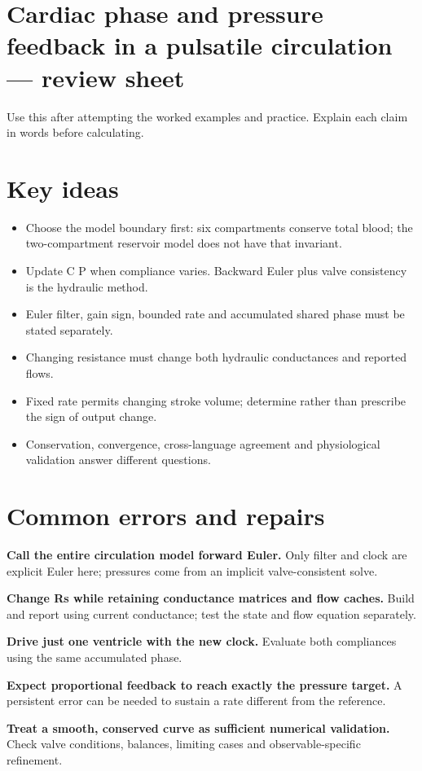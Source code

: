 \documentclass[11pt,letterpaper]{article}
\theoremstyle{definition}\newtheorem{definition}{Definition}\newtheorem{example}{Example}
\numberwithin{equation}{section}
\begin{document}
\section*{Cardiac phase and pressure feedback in a pulsatile circulation --- review sheet}
Use this after attempting the worked examples and practice. Explain each claim in words before calculating.

\section*{Key ideas}
\begin{itemize}
\item Choose the model boundary first: six compartments conserve total blood; the two-compartment reservoir model does not have that invariant.
\item Update C P when compliance varies. Backward Euler plus valve consistency is the hydraulic method.
\item Euler filter, gain sign, bounded rate and accumulated shared phase must be stated separately.
\item Changing resistance must change both hydraulic conductances and reported flows.
\item Fixed rate permits changing stroke volume; determine rather than prescribe the sign of output change.
\item Conservation, convergence, cross-language agreement and physiological validation answer different questions.
\end{itemize}
\section*{Common errors and repairs}
\textbf{Call the entire circulation model forward Euler.} Only filter and clock are explicit Euler here; pressures come from an implicit valve-consistent solve.

\textbf{Change Rs while retaining conductance matrices and flow caches.} Build and report using current conductance; test the state and flow equation separately.

\textbf{Drive just one ventricle with the new clock.} Evaluate both compliances using the same accumulated phase.

\textbf{Expect proportional feedback to reach exactly the pressure target.} A persistent error can be needed to sustain a rate different from the reference.

\textbf{Treat a smooth, conserved curve as sufficient numerical validation.} Check valve conditions, balances, limiting cases and observable-specific refinement.
\end{document}
